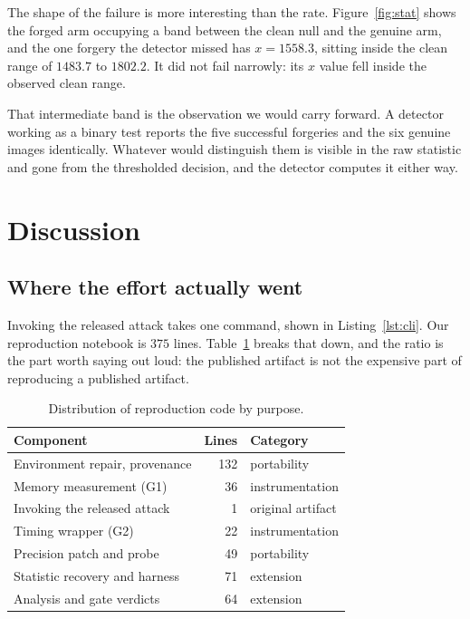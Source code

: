 \documentclass[10pt,twocolumn]{article}
\newcommand{\xstat}{\ensuremath{x}}
\begin{document}
The shape of the failure is more interesting than the rate. Figure~\ref{fig:stat}
shows the forged arm occupying a band between the clean null and the genuine arm, and
the one forgery the detector missed has $\xstat = 1558.3$, sitting inside the clean
range of $1483.7$ to $1802.2$. It did not fail narrowly: its $\xstat$ value fell inside the
observed clean range.

That intermediate band is the observation we would carry forward. A detector working
as a binary test reports the five successful forgeries and the six genuine images
identically. Whatever would distinguish them is visible in the raw statistic and gone
from the thresholded decision, and the detector computes it either way.
\section{Discussion}
\label{sec:disc}

\subsection{Where the effort actually went}

Invoking the released attack takes one command, shown in Listing~\ref{lst:cli}. Our
reproduction notebook is $375$ lines. Table~\ref{tab:effort} breaks that down, and the
ratio is the part worth saying out loud: the published artifact is not the expensive
part of reproducing a published artifact.

\begin{table}[t]
\centering\small
\caption{Distribution of reproduction code by purpose.}
\label{tab:effort}
\begin{tabular}{lrl}
\toprule
Component & Lines & Category \\
\midrule
Environment repair, provenance & 132 & portability \\
Memory measurement (G1)        & 36  & instrumentation \\
Invoking the released attack   & 1   & original artifact \\
Timing wrapper (G2)            & 22  & instrumentation \\
Precision patch and probe      & 49  & portability \\
Statistic recovery and harness & 71  & extension \\
Analysis and gate verdicts     & 64  & extension \\
\bottomrule
\end{tabular}
\end{table}
\end{document}
